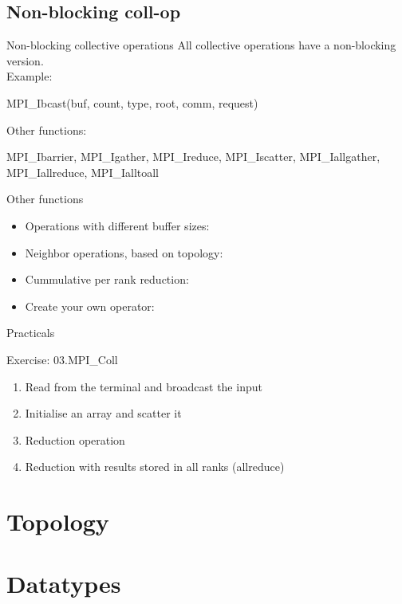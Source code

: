 \documentclass[aspectratio=43]{beamer}
\begin{document}
\subsection{Non-blocking coll-op}
\begin{frame}[fragile]{Non-blocking collective operations}
All collective operations have a non-blocking version.\\
Example:
\begin{Pseudolisting}[]{}
MPI_Ibcast(buf, count, type, root, comm, request)
\end{Pseudolisting}
Other functions:\\
\begin{Pseudolisting}[]{}
MPI_Ibarrier, MPI_Igather, MPI_Ireduce, MPI_Iscatter,
MPI_Iallgather, MPI_Iallreduce, MPI_Ialltoall
\end{Pseudolisting}
\end{frame}

\begin{frame}[fragile]{Other functions}
\begin{itemize}
    \item Operations with different buffer sizes:\\\hspace{1cm}
    \item Neighbor operations, based on topology:\\\hspace{1cm}
    \item Cummulative per rank reduction:\\\hspace{1cm}
    \item Create your own operator:\\\hspace{1cm}
\end{itemize}
\end{frame}

\begin{frame}{Practicals}
    \begin{brown2block}{Exercise: 03.MPI\_Coll}
    \begin{enumerate}
        \item Read from the terminal and broadcast the input
        \item Initialise an array and scatter it
        \item Reduction operation 
        \item Reduction with results stored in all ranks (allreduce)
    \end{enumerate}
    \end{brown2block}
\end{frame}

\section{Topology}
\section{Datatypes}

\end{document}
